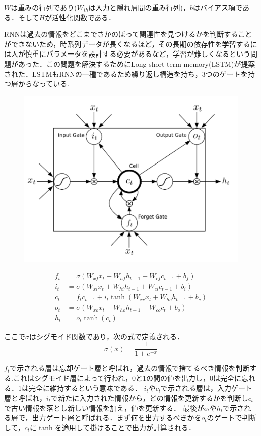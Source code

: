 $W$は重みの行列であり($W_{ih}$は入力と隠れ層間の重み行列)，$b$はバイアス項である．そして$H$が活性化関数である．

RNNは過去の情報をどこまでさかのぼって関連性を見つけるかを判断することができないため，時系列データが長くなるほど，その長期の依存性を学習するには人が慎重にパラメータを設計する必要があるなど，学習が難しくなるという問題があった．この問題を解決するためにLong-short term memory(LSTM)が提案された．LSTMもRNNの一種であるため繰り返し構造を持ち，3つのゲートを持つ層からなっている. 

\begin{figure}[h]
\centering
\includegraphics[width=0.7\linewidth]{fig/lstm.png}
\caption{}
\label{fig:LSTM}
\end{figure}

\begin{align}\label{eq:LSTM}
  f_t & = \sigma(W_{xf} x_t + W_{hf} h_{t-1} + W_{cf} c_{t-1} + b_f ) \\
  i_t & = \sigma(W_{xi} x_t + W_{hi} h_{t-1} + W_{ci} c_{t-1} + b_i) \\
  c_t & = f_t c_{t-1} + i_t \tanh(W_{xc} x_t + W_{hc} h_{t-1} + b_c) \\
  o_t & = \sigma(W_{xo} x_t + W_{ho} h_{t-1} + W_{co} c_t + b_o) \\
  h_t & = o_t \tanh(c_t) 
\end{align}

ここで$\sigma$はシグモイド関数であり，次の式で定義される．
\begin{equation}\label{eq:sigmoid}
  \sigma (x) = \dfrac{1}{1 + e^{-x}}
\end{equation}

$f_t$で示される層は忘却ゲート層と呼ばれ，過去の情報で捨てるべき情報を判断する.これはシグモイド層によって行われ，0と1の間の値を出力し，0は完全に忘れる．1は完全に維持するという意味である．
$i_t$や$c_t$で示される層は，入力ゲート層と呼ばれ，$i_t$で新たに入力された情報から，どの情報を更新するかを判断し$c_t$で古い情報を落とし新しい情報を加え，値を更新する．
最後が$o_t$や$h_t$で示される層で，出力ゲート層と呼ばれる．まず何を出力するべきかを$o_t$のゲートで判断して，$c_t$に$\tanh$を適用して掛けることで出力が計算される．


